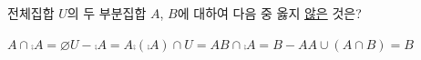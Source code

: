 전체집합 $U$의 두 부분집합 $A$, $B$에 대하여 다음 중 옳지 \underline{않은} 것은?
\begin{choicesii}{$A\cap\comp{A}=\varnothing$}{$U-\comp{A}=A$}{$\comp{(\comp{A})}\cap U=A$}{$B\cap\comp{A}=B-A$}{$A\cup(A\cap B)=B$}\end{choicesii}
